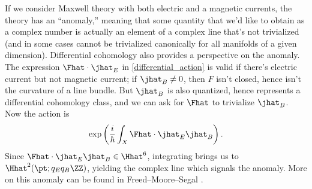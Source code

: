 If we consider Maxwell theory with both electric and a magnetic currents, the theory has an
``anomaly,'' meaning that some quantity that we'd like to obtain as a complex number is
actually an element of a complex line that's not trivialized (and in some cases cannot be trivialized canonically
for all manifolds of a given dimension). Differential cohomology also provides a perspective on the anomaly. The
expression $\Fhat\cdot\jhat_E$ in \eqref{differential_action} is valid if there's electric current but
not magnetic current; if $\jhat_B\neq 0$, then $F$ isn't closed, hence isn't the curvature of a line bundle.
But $\jhat_B$ is also quantized, hence represents a differential cohomology class, and we can ask for
$\Fhat$ to trivialize $\jhat_B$. Now the action is
\begin{equation}
	\exp\left(\frac i\hbar \int_X \Fhat\cdot \jhat_E\jhat_B\right).
\end{equation}
Since $\Fhat\cdot\jhat_E\jhat_B\in\Hhat^6$, integrating brings us to $\Hhat^2(\pt;
q_Eq_B\ZZ)$, yielding the complex line which signals the anomaly. More on this anomaly can be found in
Freed--Moore--Segal \cite{FMS07a, FMS07b}.
%
